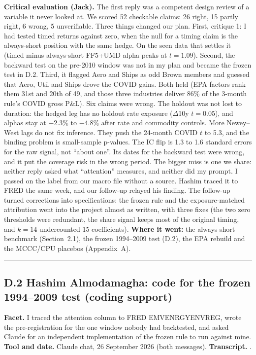 \textbf{Critical evaluation (Jack).} The first reply was a competent design review of a variable it never looked at. We scored 52 checkable claims: 26 right, 15 partly right, 6 wrong, 5 unverifiable. Three things changed our plan. First, critique 1: I had tested timed returns against zero, when the null for a timing claim is the always-short position with the same hedge. On the seen data that settles it (timed minus always-short FF5+UMD alpha peaks at $t=1.09$). Second, the backward test on the pre-2010 window was not in my plan and became the frozen test in D.2. Third, it flagged Aero and Ships as odd Brown members and guessed that Aero, Util and Ships drove the COVID gains. Both held (EPA factors rank them 31st and 20th of 49, and those three industries deliver 86\% of the 3-month rule's COVID gross P\&L). Six claims were wrong. The holdout was not lost to duration: the hedged leg has no holdout rate exposure ($\Delta$10y $t=0.05$), and alphas stay at $-2.3\%$ to $-4.8\%$ after rate and commodity controls. More Newey--West lags do not fix inference. They push the 24-month COVID $t$ to 5.3, and the binding problem is small-sample p-values. The IC flip is 1.3 to 1.6 standard errors for the raw signal, not ``about one''. Its dates for the backward test were wrong, and it put the coverage risk in the wrong period. The bigger miss is one we share: neither reply asked what ``attention'' measures, and neither did my prompt. I passed on the label from our macro file without a source. Hashim traced it to FRED the same week, and our follow-up relayed his finding. The follow-up turned corrections into specifications: the frozen rule and the exposure-matched attribution went into the project almost as written, with three fixes (the two zero thresholds were redundant, the share signal keeps most of the original timing, and $k=14$ undercounted 15 coefficients). \textbf{Where it went:} the always-short benchmark (Section~2.1), the frozen 1994--2009 test (D.2), the EPA rebuild and the MCCC/CPU placebos (Appendix~A).

\begin{center}\rule{0.5\linewidth}{0.5pt}\end{center}

\subsection*{D.2 Hashim Almodamagha: code for the frozen 1994--2009 test (coding support)}

\textbf{Facet.} I traced the attention column to FRED EMVENRGYENVREG, wrote the pre-registration for the one window nobody had backtested, and asked Claude for an independent implementation of the frozen rule to run against mine. \textbf{Tool and date.} Claude chat, 26 September 2026 (both messages). \textbf{Transcript.} .

